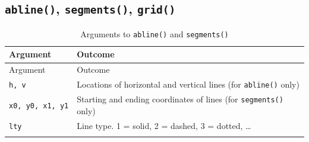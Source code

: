 \documentclass[]{book}
\theoremstyle{definition}
\theoremstyle{definition}
\theoremstyle{remark}
\begin{document}
\subsection{\texorpdfstring{\texttt{abline()}, \texttt{segments()},
\texttt{grid()}}{abline(), segments(), grid()}}\label{abline-segments-grid}

\begin{longtable}[]{@{}ll@{}}
\caption{\label{tab:linearguments} Arguments to \texttt{abline()} and
\texttt{segments()}}\tabularnewline
\toprule
\begin{minipage}[b]{0.14\columnwidth}\raggedright\strut
Argument\strut
\end{minipage} & \begin{minipage}[b]{0.50\columnwidth}\raggedright\strut
Outcome\strut
\end{minipage}\tabularnewline
\midrule
\endfirsthead
\toprule
\begin{minipage}[b]{0.14\columnwidth}\raggedright\strut
Argument\strut
\end{minipage} & \begin{minipage}[b]{0.50\columnwidth}\raggedright\strut
Outcome\strut
\end{minipage}\tabularnewline
\midrule
\endhead
\begin{minipage}[t]{0.14\columnwidth}\raggedright\strut
\texttt{h,\ v}\strut
\end{minipage} & \begin{minipage}[t]{0.50\columnwidth}\raggedright\strut
Locations of horizontal and vertical lines (for \texttt{abline()}
only)\strut
\end{minipage}\tabularnewline
\begin{minipage}[t]{0.14\columnwidth}\raggedright\strut
\texttt{x0,\ y0,\ x1,\ y1}\strut
\end{minipage} & \begin{minipage}[t]{0.50\columnwidth}\raggedright\strut
Starting and ending coordinates of lines (for \texttt{segments()}
only)\strut
\end{minipage}\tabularnewline
\begin{minipage}[t]{0.14\columnwidth}\raggedright\strut
\texttt{lty}\strut
\end{minipage} & \begin{minipage}[t]{0.50\columnwidth}\raggedright\strut
Line type. 1 = solid, 2 = dashed, 3 = dotted, \ldots{}\strut
\end{minipage}\tabularnewline
\begin{minipage}[t]{0.14\columnwidth}\raggedright\strut

\end{minipage}
\end{longtable}
\end{document}
